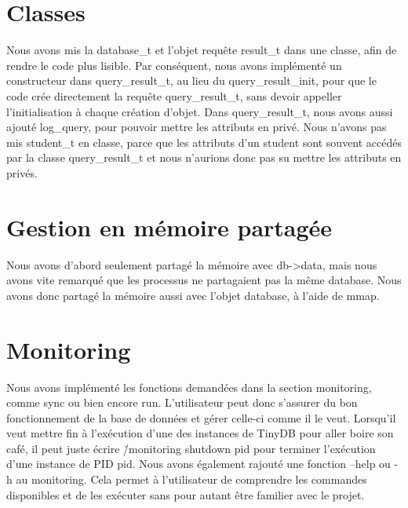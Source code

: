 \documentclass[utf8]{article}
\begin{document}
\section{Classes}
\indent{}
\par
Nous avons mis la database\_t et l'objet requête result\_t dans une classe, afin de rendre le code plus lisible. Par conséquent,
nous avons implémenté un constructeur dans query\_result\_t, au lieu du query\_result\_init, pour que le code
crée directement la requête query\_result\_t, sans devoir appeller l'initialisation à chaque création d'objet.
Dans query\_result\_t, nous avons aussi ajouté log\_query, pour pouvoir mettre les attributs en privé.
Nous n'avons pas mis student\_t en classe, parce que les attributs d'un student sont souvent accédés par la classe query\_result\_t
et nous n'aurions donc pas su mettre les attributs en privés.
\par

\section{Gestion en mémoire partagée}
\indent{}
\par
Nous avons d'abord seulement partagé la mémoire avec db->data, mais nous avons vite remarqué que les processus
ne partagaient pas la même database. Nous avons donc partagé la mémoire aussi avec l'objet database, à l'aide de mmap.
\par
\newpage
\section{Monitoring}
\indent{}
\par
Nous avons implémenté les fonctions demandées dans la section monitoring, comme sync ou bien encore run.
L'utilisateur peut donc s'assurer du bon fonctionnement de la base de données et gérer celle-ci comme il le veut. Lorsqu'il veut mettre fin à l'exécution d'une des instances de TinyDB pour aller boire son café, il peut juste écrire \./monitoring shutdown pid
pour terminer l'exécution d'une instance de PID pid.\newline
Nous avons également rajouté une fonction --help ou -h au monitoring. 
Cela permet à l'utilisateur de comprendre les commandes disponibles et de les exécuter sans pour autant être familier avec le projet.
\par
\end{document}
